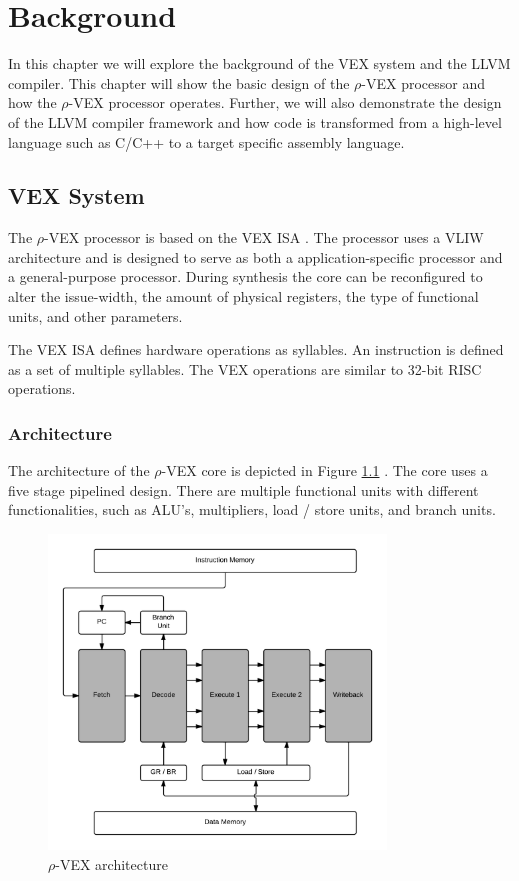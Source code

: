 \chapter{Background}
\label{chap:background}
In this chapter we will explore the background of the VEX system and the LLVM compiler. This chapter will show the basic design of the $\rho$-VEX processor and how the $\rho$-VEX processor operates. Further, we will also demonstrate the design of the LLVM compiler framework and how code is transformed from a high-level language such as C/C++ to a target specific assembly language.

\section{VEX System}
The $\rho$-VEX processor is based on the VEX ISA \cite{As:2008rt}. The processor uses a VLIW architecture and is designed to serve as both a application-specific processor and a general-purpose processor. During synthesis the core can be reconfigured to alter the issue-width, the amount of physical registers, the type of functional units, and other parameters.

The VEX ISA defines hardware operations as syllables. An instruction is defined as a set of multiple syllables. The VEX operations are similar to 32-bit RISC operations.

\subsection{Architecture}
The architecture of the $\rho$-VEX core is depicted in Figure \ref{fig:rvex_arch} \cite{Seedorf:2011fj}. The core uses a five stage pipelined design. There are multiple functional units with different functionalities, such as ALU’s, multipliers, load / store units, and branch units.

\begin{figure}[ht]
\centering
\includegraphics[width=0.8\textwidth]{2_background/img/rvex_arch.png}
\caption{$\rho$-VEX architecture \cite{Roel-Seedorf:2012qf}}
\label{fig:rvex_arch}
\end{figure}

